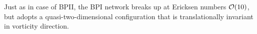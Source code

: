 \documentclass[aps,pre,reprint,superscriptaddress, twocolumn]{revtex4}
\begin{document}
Just as in case of BPII, the BPI network breaks up at Ericksen numbers ${\cal O}(10)$,
but adopts a quasi-two-dimensional configuration that is translationally 
invariant in vorticity direction.  


%



%
\end{document}
